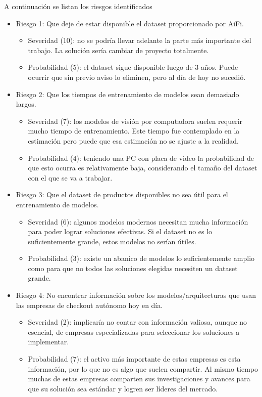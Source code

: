 \documentclass[
11pt, %
]{charter}
\begin{document}
A continuación se listan los riesgos identificados

\begin{itemize}
\item Riesgo 1: Que deje de estar disponible el dataset proporcionado por AiFi.
\begin{itemize}
\item Severidad (10): no se podría llevar adelante la parte más importante del trabajo. La solución sería cambiar de proyecto totalmente.
\item Probabilidad (5): el dataset sigue disponible luego de 3 años. Puede ocurrir que sin previo aviso lo eliminen, pero al día de hoy no sucedió.
\end{itemize}
\item Riesgo 2: Que los tiempos de entrenamiento de modelos sean demasiado largos.
\begin{itemize}
\item Severidad (7): los modelos de visión por computadora suelen requerir mucho tiempo de entrenamiento. Este tiempo fue contemplado en la estimación pero puede que esa estimación no se ajuste a la realidad.
\item Probabilidad (4): teniendo una PC con placa de video la probabilidad de que esto ocurra es relativamente baja, considerando el tamaño del dataset con el que se va a trabajar.
\end{itemize}
\item Riesgo 3: Que el dataset de productos disponibles no sea útil para el entrenamiento de modelos.
\begin{itemize}
\item Severidad (6): algunos modelos modernos necesitan mucha información para poder lograr soluciones efectivas. Si el dataset no es lo suficientemente grande, estos modelos no serían útiles.
\item Probabilidad (3): existe un abanico de modelos lo suficientemente amplio como para que no todos las soluciones elegidas necesiten un dataset grande.
\end{itemize}
\item Riesgo 4: No encontrar información sobre los modelos/arquitecturas que usan las empresas de checkout autónomo hoy en día.
\begin{itemize}
\item Severidad (2): implicaría no contar con información valiosa, aunque no esencial, de empresas especializadas para seleccionar los soluciones a implementar. 
\item Probabilidad (7): el activo más importante de estas empresas es esta información, por lo que no es algo que suelen compartir. Al mismo tiempo muchas de estas empresas comparten sus investigaciones y avances para que su solución sea estándar y logren ser líderes del mercado.

\end{itemize}
\end{itemize}
\end{document}
